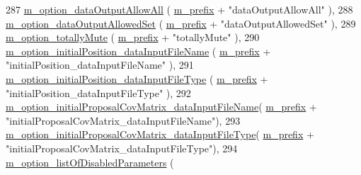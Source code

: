 \begin{DoxyCode}
287   \hyperlink{class_q_u_e_s_o_1_1_metropolis_hastings_s_g_options_a6d1f0f09fa5e238a54c6269c48fc6b29}{m\_option\_dataOutputAllowAll}                        (
      \hyperlink{class_q_u_e_s_o_1_1_metropolis_hastings_s_g_options_a4f7c510aaa530336d24259e2a89f5d0b}{m\_prefix} + \textcolor{stringliteral}{"dataOutputAllowAll"}                        ),
288   \hyperlink{class_q_u_e_s_o_1_1_metropolis_hastings_s_g_options_a7d12ea603c8aba9215ad462d51720204}{m\_option\_dataOutputAllowedSet}                      (
      \hyperlink{class_q_u_e_s_o_1_1_metropolis_hastings_s_g_options_a4f7c510aaa530336d24259e2a89f5d0b}{m\_prefix} + \textcolor{stringliteral}{"dataOutputAllowedSet"}                      ),
289   \hyperlink{class_q_u_e_s_o_1_1_metropolis_hastings_s_g_options_adc30bd8388e2da2b063671fc5ccad850}{m\_option\_totallyMute}                               (
      \hyperlink{class_q_u_e_s_o_1_1_metropolis_hastings_s_g_options_a4f7c510aaa530336d24259e2a89f5d0b}{m\_prefix} + \textcolor{stringliteral}{"totallyMute"}                               ),
290   \hyperlink{class_q_u_e_s_o_1_1_metropolis_hastings_s_g_options_a2dbb00eec372f529d21f770b0f220bd9}{m\_option\_initialPosition\_dataInputFileName}         (
      \hyperlink{class_q_u_e_s_o_1_1_metropolis_hastings_s_g_options_a4f7c510aaa530336d24259e2a89f5d0b}{m\_prefix} + \textcolor{stringliteral}{"initialPosition\_dataInputFileName"}         ),
291   \hyperlink{class_q_u_e_s_o_1_1_metropolis_hastings_s_g_options_ad997674bedeb76faf75773dc8c3dfd17}{m\_option\_initialPosition\_dataInputFileType}         (
      \hyperlink{class_q_u_e_s_o_1_1_metropolis_hastings_s_g_options_a4f7c510aaa530336d24259e2a89f5d0b}{m\_prefix} + \textcolor{stringliteral}{"initialPosition\_dataInputFileType"}         ),
292   \hyperlink{class_q_u_e_s_o_1_1_metropolis_hastings_s_g_options_a9d80faf22cf4d5614819ae5259463e89}{m\_option\_initialProposalCovMatrix\_dataInputFileName}(
      \hyperlink{class_q_u_e_s_o_1_1_metropolis_hastings_s_g_options_a4f7c510aaa530336d24259e2a89f5d0b}{m\_prefix} + \textcolor{stringliteral}{"initialProposalCovMatrix\_dataInputFileName"}),
293   \hyperlink{class_q_u_e_s_o_1_1_metropolis_hastings_s_g_options_a00116cfe535c1bea24a321f76c8c501a}{m\_option\_initialProposalCovMatrix\_dataInputFileType}(
      \hyperlink{class_q_u_e_s_o_1_1_metropolis_hastings_s_g_options_a4f7c510aaa530336d24259e2a89f5d0b}{m\_prefix} + \textcolor{stringliteral}{"initialProposalCovMatrix\_dataInputFileType"}),
294   \hyperlink{class_q_u_e_s_o_1_1_metropolis_hastings_s_g_options_ae3b9e124f89c653b2b2b09d97baa87ba}{m\_option\_listOfDisabledParameters}                  (

\end{DoxyCode}
